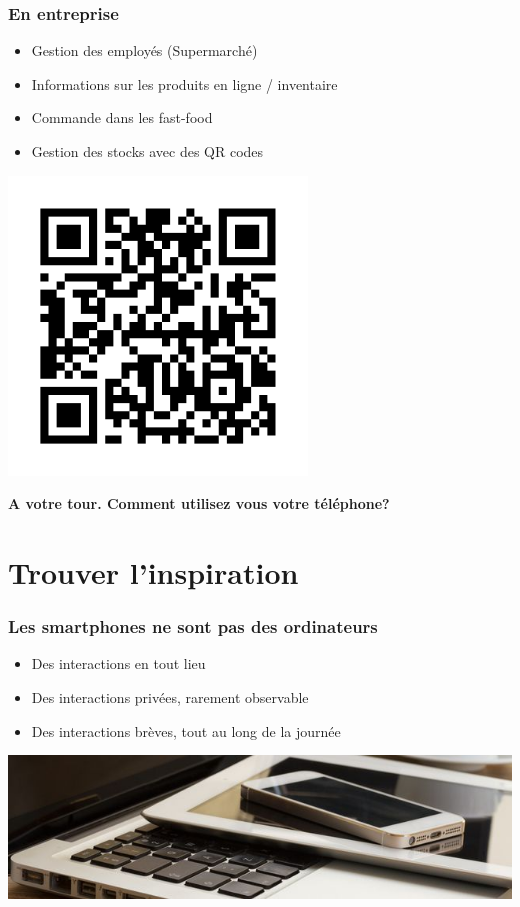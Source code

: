 \documentclass{beamer}
\begin{document}
\begin{frame}
\frametitle{En entreprise}

\begin{itemize}
	\item Gestion des employés (Supermarché)
	\item Informations sur les produits en ligne / inventaire
	\item Commande dans les fast-food
	\item Gestion des stocks avec des QR codes
\end{itemize}


\begin{center}
\includegraphics[scale=0.6]{qrcode.png}
\end{center}
\end{frame}

\begin{frame}
\begin{center}
\textbf{A votre tour. Comment utilisez vous votre téléphone?}
\end{center}
\end{frame}

\section{Trouver l'inspiration}

\begin{frame}
\frametitle{Les smartphones ne sont pas des ordinateurs}

\begin{itemize}
	\item Des interactions en tout lieu
	\item Des interactions privées, rarement observable
	\item Des interactions brèves, tout au long de la journée
\end{itemize}

\begin{center}
\includegraphics[scale=1]{tel-tab-lap.jpg}
\end{center}
\end{frame}
\end{document}
